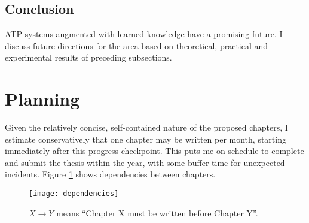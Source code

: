 \documentclass[a4paper]{article}
\begin{document}
\subsection{Conclusion}
ATP systems augmented with learned knowledge have a promising future.
I discuss future directions for the area based on theoretical, practical and experimental results of preceding subsections.

\section{Planning}
Given the relatively concise, self-contained nature of the proposed chapters, I estimate conservatively that one chapter may be written per month, starting immediately after this progress checkpoint.
This puts me on-schedule to complete and submit the thesis within the year, with some buffer time for unexpected incidents.
Figure \ref{fig:deps} shows dependencies between chapters.
\begin{figure}
	\centering
	\texttt{[image: dependencies]}
	\caption{\(X \rightarrow Y\) means ``Chapter X must be written before Chapter Y''.}
	\label{fig:deps}
\end{figure}

\printbibliography
\end{document}
